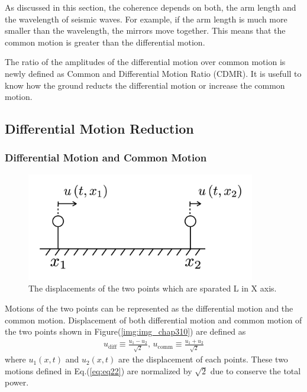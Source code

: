 As discussed in this section, the coherence depends on both, the arm length and the wavelength of seismic waves. For example, if the arm length is much more smaller than the wavelength, the mirrors move together. This means that the common motion is greater than the differential motion.

The ratio of the amplitudes of the differential motion over common motion is newly defined as Common and Differential Motion Ratio (CDMR). It is usefull to know how the ground reducts the differential motion or increase the common motion. 

\subsection{Differential Motion Reduction}
\subsubsection{Differential Motion and Common Motion}


\begin{figure}[h]
  \begin{center}
    \includegraphics[width=10.0cm]{./img_chap3/img315.png}
    \caption{The displacements of the two points which are sparated L in X axis. }
  \end{center}
\end{figure}


Motions of the two points can be represented as the differential motion and the common motion. Displacement of both differential motion and common motion of the two points shown in Figure(\ref{img:img_chap310}) are defined as
\begin{eqnarray}\label{eq:eq22}
  u_{\mathrm{diff}} \equiv \frac{u_{1}-u_{2}}{\sqrt{2}}, \,
  u_{\mathrm{comm}}  \equiv \frac{u_{1}+u_{2}}{\sqrt{2}}
\end{eqnarray}
where $u_{1}(x,t)$ and $u_2(x,t)$ are the displacement of each points. These two motions defined in Eq.(\ref{eq:eq22}) are normalized by $\sqrt{2}$ due to conserve the total power.


